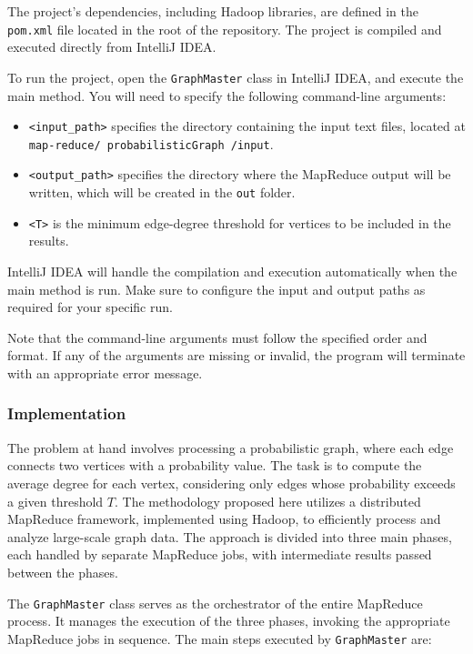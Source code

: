 \documentclass[acmlarge]{acmart}
\begin{document}
The project’s dependencies, including Hadoop libraries, are defined in the \texttt{pom.xml} file located in the root of
the repository.
The project is compiled and executed directly from IntelliJ IDEA.

To run the project, open the \texttt{GraphMaster} class in IntelliJ IDEA, and execute the main method.
You will need to specify the following command-line arguments:

\begin{itemize}
  \item \texttt{<input\_path>} specifies the directory containing the input text files, located at
        \texttt{map-reduce/ probabilisticGraph /input}.
  \item \texttt{<output\_path>} specifies the directory where the MapReduce output will be written, which will be
        created in the \texttt{out} folder.
  \item \texttt{<T>} is the minimum edge-degree threshold for vertices to be included in the results.
\end{itemize}

IntelliJ IDEA will handle the compilation and execution automatically when the main method is run.
Make sure to configure the input and output paths as required for your specific run.

Note that the command-line arguments must follow the specified order and format.
If any of the arguments are missing or invalid, the program will terminate with an appropriate error message.

\subsubsection{Implementation}
The problem at hand involves processing a probabilistic graph, where each edge connects two vertices with a probability
value.
The task is to compute the average degree for each vertex, considering only edges whose probability exceeds a given
threshold \( T \).
The methodology proposed here utilizes a distributed MapReduce framework, implemented using Hadoop, to efficiently
process and analyze large-scale graph data.
The approach is divided into three main phases, each handled by separate MapReduce jobs, with intermediate results
passed between the phases.

The \texttt{GraphMaster} class serves as the orchestrator of the entire MapReduce process.
It manages the execution of the three phases, invoking the appropriate MapReduce jobs in sequence.
The main steps executed by \texttt{GraphMaster} are:
\end{document}
